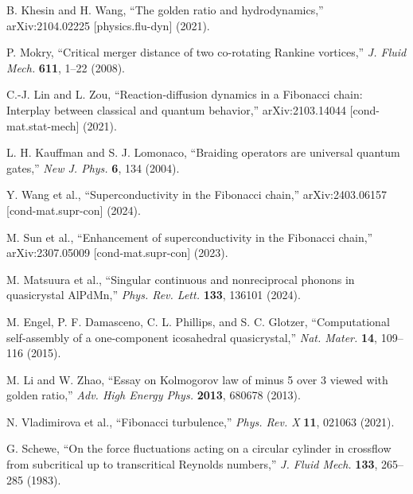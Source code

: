 \documentclass[11pt]{article}
\theoremstyle{remark}
\theoremstyle{definition}
\begin{document}
\begin{thebibliography}{99}

B. Khesin and H. Wang,
``The golden ratio and hydrodynamics,''
arXiv:2104.02225 [physics.flu-dyn] (2021).

P. Mokry,
``Critical merger distance of two co-rotating Rankine vortices,''
\emph{J. Fluid Mech.} \textbf{611}, 1--22 (2008).

C.-J. Lin and L. Zou,
``Reaction-diffusion dynamics in a Fibonacci chain: Interplay between classical and quantum behavior,''
arXiv:2103.14044 [cond-mat.stat-mech] (2021).

L. H. Kauffman and S. J. Lomonaco,
``Braiding operators are universal quantum gates,''
\emph{New J. Phys.} \textbf{6}, 134 (2004).

Y. Wang et al.,
``Superconductivity in the Fibonacci chain,''
arXiv:2403.06157 [cond-mat.supr-con] (2024).

M. Sun et al.,
``Enhancement of superconductivity in the Fibonacci chain,''
arXiv:2307.05009 [cond-mat.supr-con] (2023).

M. Matsuura et al.,
``Singular continuous and nonreciprocal phonons in quasicrystal AlPdMn,''
\emph{Phys. Rev. Lett.} \textbf{133}, 136101 (2024).

M. Engel, P. F. Damasceno, C. L. Phillips, and S. C. Glotzer,
``Computational self-assembly of a one-component icosahedral quasicrystal,''
\emph{Nat. Mater.} \textbf{14}, 109--116 (2015).

M. Li and W. Zhao,
``Essay on Kolmogorov law of minus 5 over 3 viewed with golden ratio,''
\emph{Adv. High Energy Phys.} \textbf{2013}, 680678 (2013).

N. Vladimirova et al.,
``Fibonacci turbulence,''
\emph{Phys. Rev. X} \textbf{11}, 021063 (2021).

G. Schewe,
``On the force fluctuations acting on a circular cylinder in crossflow from subcritical up to transcritical Reynolds numbers,''
\emph{J. Fluid Mech.} \textbf{133}, 265--285 (1983).

\end{thebibliography}
\end{document}
